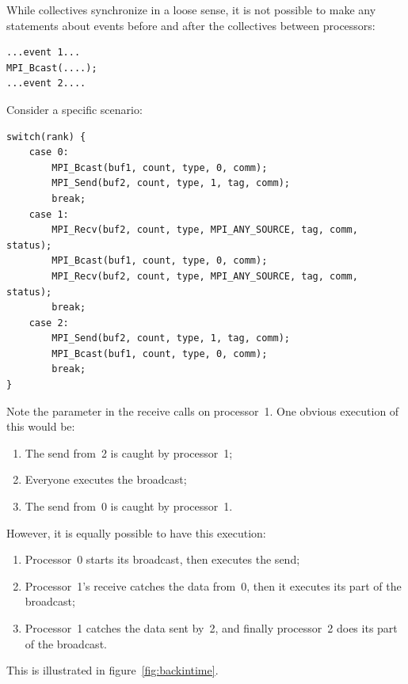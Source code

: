 While collectives synchronize in a loose sense, it is not possible to
make any statements about events before and after the collectives
between processors:
\begin{lstlisting}
...event 1...
MPI_Bcast(....);
...event 2....
\end{lstlisting}
Consider a specific scenario:
\begin{lstlisting}
switch(rank) { 
    case 0: 
        MPI_Bcast(buf1, count, type, 0, comm); 
        MPI_Send(buf2, count, type, 1, tag, comm); 
        break; 
    case 1: 
        MPI_Recv(buf2, count, type, MPI_ANY_SOURCE, tag, comm, status); 
        MPI_Bcast(buf1, count, type, 0, comm); 
        MPI_Recv(buf2, count, type, MPI_ANY_SOURCE, tag, comm, status); 
        break; 
    case 2: 
        MPI_Send(buf2, count, type, 1, tag, comm); 
        MPI_Bcast(buf1, count, type, 0, comm); 
        break; 
}
\end{lstlisting}
Note the  parameter in the receive calls on processor~1.
One obvious execution of this would be:
\begin{enumerate}
\item The send from~2 is caught by processor~1;
\item Everyone executes the broadcast;
\item The send from~0 is caught by processor~1.
\end{enumerate}
However, it is equally possible to have this execution:
\begin{enumerate}
\item Processor~0 starts its broadcast, then executes the send;
\item Processor~1's receive catches the data from~0, then it executes
  its part of the broadcast;
\item Processor~1 catches the data sent by~2, and finally processor~2
  does its part of the broadcast.
\end{enumerate}

This is illustrated in figure~\ref{fig:backintime}.
